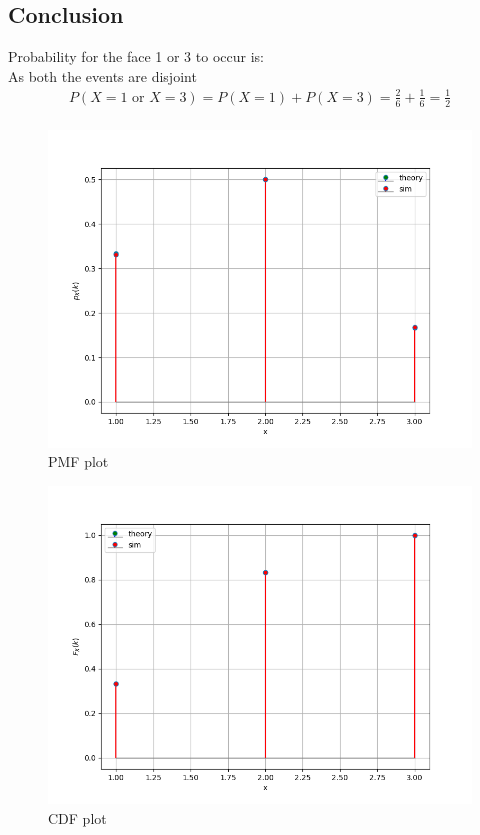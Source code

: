 \documentclass[journal,12pt,onecolumn]{IEEEtran}
\theoremstyle{remark}
\begin{document}
\subsection*{Conclusion}
Probability for the face 1 or 3 to occur is:\\
As both the events are disjoint
\begin{align*}
    P(X=1 \text{ or } X=3)=P(X=1) + P(X=3)=\frac{2}{6}+\frac{1}{6}=\frac{1}{2}\\
\end{align*}
\begin{figure}[h!]
		\centering
		\includegraphics[width=\columnwidth]{figs/Q7_1.png}
		\caption{PMF plot}
		\label{stemplot}
	\end{figure}
	\begin{figure}[h!]
		\centering
		\includegraphics[width=\columnwidth]{figs/Q7_2.png}
		\caption{CDF plot}
		\label{stemplot}
	\end{figure}
\end{document}
